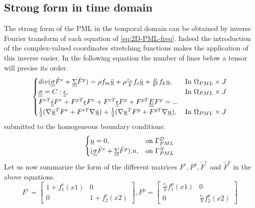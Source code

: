 \subsection{Strong form in time domain}
\par The strong form of the PML in the temporal domain can be obtained by inverse Fourier transform of each equation of \ref{eq:2D-PML-freq}. Indeed the introduction of the complex-valued coordinates stretching functions makes the application of this inverse easier. In the following equation the number of lines below a tensor will precise its order. 
\begin{equation}
\begin{cases}
div(\underline{\underline{\sigma}}\tilde{F}^e + \underline{\underline{\Sigma}}\tilde{F}^p) = \rho f_m \underline{\ddot{u}} + \rho \frac{c_s}{b} f_c \underline{\dot{u}} + \frac{\mu}{b^2}f_k \underline{u}, & \text{In } \Omega_{PML} \times J\\
\underline{\underline{\sigma}} =  C : \underline{\underline{\epsilon}} , & \text{In } \Omega_{PML} \times J\\
F^{eT} \underline{\underline{\dot{\epsilon}}}F^e + F^{pT}\underline{\epsilon}F^e + F^{eT}\underline{\underline{\epsilon}}F^p + F^{pT} \underline{\underline{E}} F^p = ...\\
\frac{1}{2}(\nabla \underline{\dot{u}}^T F^e + F^{eT} \nabla \underline{\dot{u}})+\frac{1}{2}(\nabla \underline{u}^T F^p + F^{pT} \nabla \underline{u}), & \text{In } \Omega_{PML} \times J\\
\end{cases}
\label{eq:2D-PML-strong-timeD}
\end{equation}
submitted to the homogeneous boundary conditions:
\begin{equation}
\begin{cases}
\underline{u}=0,& \text{on } \Gamma_{PML}^D\\
(\underline{\underline{\sigma}}\tilde{F}^e + \underline{\underline{\Sigma}}\tilde{F}^p).n , & \text{on } \Gamma_{PML}^N 
\end{cases}
\label{eq:conditions-lim}
\end{equation}
Let us now summarize the form of the different matrices $F^e,F^p,\tilde{F}^e$ and $\tilde{F}^p$ in the above equations.
\begin{equation}
F^e = \begin{bmatrix}
1+f^e_1(x1)&0\\0&1+f^e_2(x2)
\end{bmatrix}, F^p = \begin{bmatrix}
\frac{c_s}{b}f^p_1(x1)&0\\0&\frac{c_s}{b}f^p_2(x2) 
\end{bmatrix} 
\end{equation}
